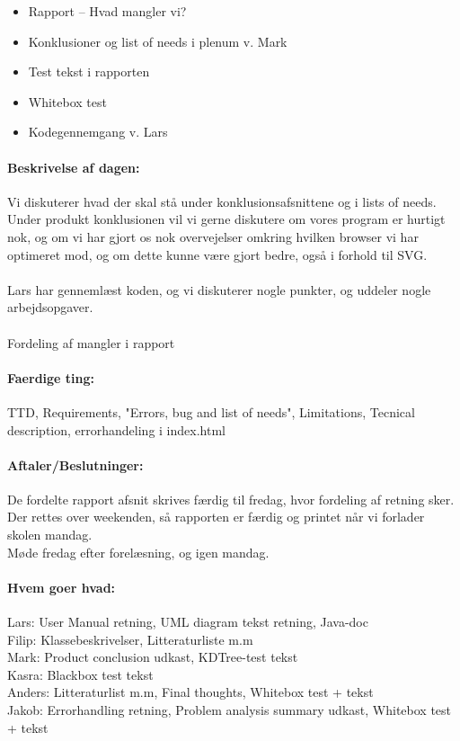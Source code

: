 \documentclass[a4paper,10pt,titlepage]{article}
\begin{document}
		\begin{itemize}
					\item Rapport – Hvad mangler vi?
					\item Konklusioner og list of needs i plenum v. Mark
					\item Test tekst i rapporten
					\item Whitebox test
					\item Kodegennemgang v. Lars
		\end{itemize}
		
		\paragraph{Beskrivelse af dagen:}
		Vi diskuterer hvad der skal stå under konklusionsafsnittene og i lists of needs.
		Under produkt konklusionen vil vi gerne diskutere om vores program er hurtigt nok,
		og om vi har gjort os nok overvejelser omkring hvilken browser vi har optimeret mod,
		og om dette kunne være gjort bedre, også i forhold til SVG.\\
		\\

		Lars har gennemlæst koden, og vi diskuterer nogle punkter, og uddeler nogle arbejdsopgaver.\\
		\\
		
		Fordeling af mangler i rapport\\

		\paragraph{Faerdige ting:}
		TTD, Requirements, "Errors, bug and list of needs", Limitations, 
		Tecnical description, errorhandeling i index.html\\
		
		\paragraph{Aftaler/Beslutninger:}
		De fordelte rapport afsnit skrives færdig til fredag, hvor fordeling af retning sker.\\
		Der rettes over weekenden, så rapporten er færdig og printet når vi forlader skolen mandag.\\
		Møde fredag efter forelæsning, og igen mandag.\\
		
		\paragraph{Hvem goer hvad:}
		Lars: User Manual retning, UML diagram tekst retning, Java-doc\\
		Filip: Klassebeskrivelser, Litteraturliste m.m\\
		Mark: Product conclusion udkast, KDTree-test tekst\\
		Kasra: Blackbox test tekst\\
		Anders: Litteraturlist m.m, Final thoughts, Whitebox test + tekst\\
		Jakob: Errorhandling retning, Problem analysis summary udkast, Whitebox test + tekst\\
		
\end{document}
